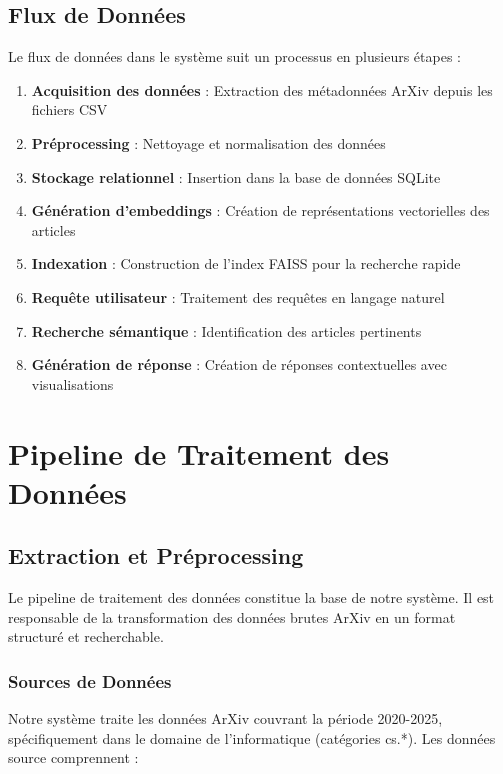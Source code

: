 \documentclass[12pt,a4paper]{article}
\begin{document}
\subsection{Flux de Données}

Le flux de données dans le système suit un processus en plusieurs étapes :

\begin{enumerate}
    \item \textbf{Acquisition des données} : Extraction des métadonnées ArXiv depuis les fichiers CSV
    \item \textbf{Préprocessing} : Nettoyage et normalisation des données
    \item \textbf{Stockage relationnel} : Insertion dans la base de données SQLite
    \item \textbf{Génération d'embeddings} : Création de représentations vectorielles des articles
    \item \textbf{Indexation} : Construction de l'index FAISS pour la recherche rapide
    \item \textbf{Requête utilisateur} : Traitement des requêtes en langage naturel
    \item \textbf{Recherche sémantique} : Identification des articles pertinents
    \item \textbf{Génération de réponse} : Création de réponses contextuelles avec visualisations
\end{enumerate}

\section{Pipeline de Traitement des Données}

\subsection{Extraction et Préprocessing}

Le pipeline de traitement des données constitue la base de notre système. Il est responsable de la transformation des données brutes ArXiv en un format structuré et recherchable.

\subsubsection{Sources de Données}

Notre système traite les données ArXiv couvrant la période 2020-2025, spécifiquement dans le domaine de l'informatique (catégories cs.*). Les données source comprennent :
\end{document}
